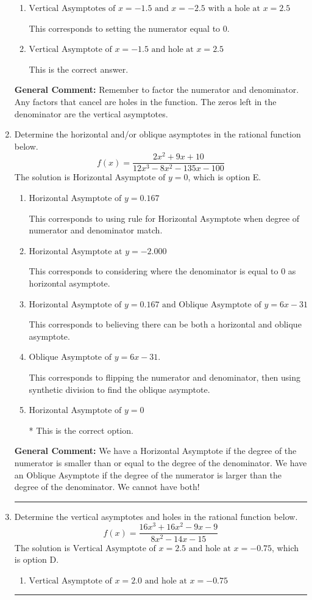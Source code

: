 \documentclass{extbook}[14pt]
\newcommand{\litem}[1]{\item #1

\rule{\textwidth}{0.4pt}}
\begin{document}
\begin{enumerate}
{\begin{enumerate}[label=\Alph*.]
This corresponds to considering where the denominator is equal to 0 as holes.
\item \( \text{Vertical Asymptotes of } x = -1.5 \text{ and } x = -2.5 \text{ with a hole at } x = 2.5 \)

This corresponds to setting the numerator equal to 0.
\item \( \text{Vertical Asymptote of } x = -1.5 \text{ and hole at } x = 2.5 \)

This is the correct answer.
\end{enumerate}

\textbf{General Comment:} Remember to factor the numerator and denominator. Any factors that cancel are holes in the function. The zeros left in the denominator are the vertical asymptotes.
}
\litem{
Determine the horizontal and/or oblique asymptotes in the rational function below.
\[ f(x) = \frac{2x^{2} +9 x + 10}{12x^{3} -8 x^{2} -135 x -100} \]The solution is \( \text{Horizontal Asymptote of } y = 0 \), which is option E.\begin{enumerate}[label=\Alph*.]
\item \( \text{Horizontal Asymptote of } y = 0.167  \)

This corresponds to using rule for Horizontal Asymptote when degree of numerator and denominator match.
\item \( \text{Horizontal Asymptote at } y = -2.000 \)

This corresponds to considering where the denominator is equal to 0 as horizontal asymptote.
\item \( \text{Horizontal Asymptote of } y = 0.167 \text{ and Oblique Asymptote of } y = 6x -31 \)

This corresponds to believing there can be both a horizontal and oblique asymptote.
\item \( \text{Oblique Asymptote of } y = 6x -31. \)

This corresponds to flipping the numerator and denominator, then using synthetic division to find the oblique asymptote.
\item \( \text{Horizontal Asymptote of } y = 0 \)

* This is the correct option.
\end{enumerate}

\textbf{General Comment:} We have a Horizontal Asymptote if the degree of the numerator is smaller than or equal to the degree of the denominator. We have an Oblique Asymptote if the degree of the numerator is larger than the degree of the denominator. We cannot have both!
}
\litem{
Determine the vertical asymptotes and holes in the rational function below.
\[ f(x) = \frac{16x^{3} +16 x^{2} -9 x -9}{8x^{2} -14 x -15} \]The solution is \( \text{Vertical Asymptote of } x = 2.5 \text{ and hole at } x = -0.75 \), which is option D.\begin{enumerate}[label=\Alph*.]
\item \( \text{Vertical Asymptote of } x = 2.0 \text{ and hole at } x = -0.75 \)


\end{enumerate}}
\end{enumerate}
\end{document}
